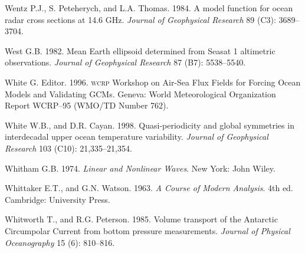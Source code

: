 \begin{thebibliography}{999}
Wentz P.J., S. Peteherych, and L.A. Thomas.  1984. A model function
for ocean radar cross sections at 14.6 GHz. \textit{Journal of
  Geophysical Research} 89 (C3): 3689--3704.
%

West G.B.  1982. Mean Earth ellipsoid determined from Seasat 1
altimetric observations. \textit{Journal of Geophysical Research} 87
(B7): 5538--5540.
%

White G. Editor.  1996. \textsc{wcrp} Workshop on Air-Sea Flux Fields
for Forcing Ocean Models and Validating GCMs. Geneva: World
Meteorological Organization Report WCRP--95 (WMO/TD Number 762).
%

White W.B., and D.R. Cayan.  1998. Quasi-periodicity and global
symmetries in interdecadal upper ocean temperature
variability. \textit{Journal of Geophysical Research} 103 (C10):
21,335--21,354.
%

Whitham G.B.  1974. \textit{Linear and Nonlinear Waves}.  New York:
John Wiley.
%

Whittaker E.T., and G.N. Watson.  1963. \textit{A Course of Modern
  Analysis}. 4th ed.  Cambridge: University Press.
%

Whitworth T., and R.G. Peterson.  1985. Volume transport of the
  Antarctic Circumpolar Current from bottom pressure
  measurements. \textit{Journal of Physical Oceanography} 15 (6):
  810--816.
%


\end{thebibliography}
